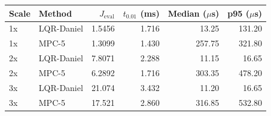 \begin{tabular}{llrrrr}
\toprule
Scale & Method & $J_{\mathrm{eval}}$ & $t_{0.01}$ (ms) & Median ($\mu$s) & p95 ($\mu$s) \\ \midrule
1x & LQR-Daniel & 1.5456 & 1.716 & 13.25 & 131.20 \\ 
1x & MPC-5 & 1.3099 & 1.430 & 257.75 & 321.80 \\ 
2x & LQR-Daniel & 7.8071 & 2.288 & 11.15 & 16.65 \\ 
2x & MPC-5 & 6.2892 & 1.716 & 303.35 & 478.20 \\ 
3x & LQR-Daniel & 21.074 & 3.432 & 11.20 & 16.65 \\ 
3x & MPC-5 & 17.521 & 2.860 & 316.85 & 532.80 \\ 
\bottomrule
\end{tabular}
